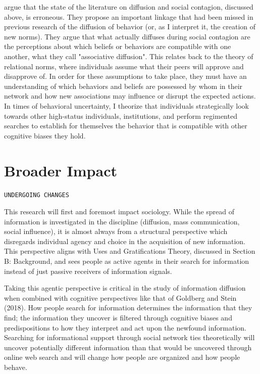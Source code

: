 \citet{goldbergSocialContagionAssociative2018} argue that the state of the
literature on diffusion and social contagion, discussed above, is erroneous.
They propose an important linkage that had been missed in previous research of
the diffusion of behavior (or, as I interpret it, the creation of new norms).
They argue that what actually diffuses during social contagion are the
perceptions about which beliefs or behaviors are compatible with one another,
what they call "associative diffusion". 
This relates back to the theory of relational norms, where individuals assume
what their peers will approve and disapprove of. In order for these assumptions 
to take place, they must have an understanding of which behaviors and beliefs
are possessed by whom in their network and how new associations may influence
or disrupt the expected actions. 
In times of behavioral uncertainty, I
theorize that individuals strategically look towards other high-status
individuals, institutions, and perform regimented searches to establish for
themselves the behavior that is compatible with other cognitive biases they
hold.

\section{Broader Impact}
\begin{center}
    \texttt{UNDERGOING CHANGES}
\end{center}


This research will first and foremost impact sociology. While the spread
of information is investigated in the discipline (diffusion, mass
communication, social influence), it is almost always from a structural
perspective which disregards individual agency and choice in the
acquisition of new information. This perspective aligns with Uses and
Gratifications Theory, discussed in Section B: Background, and sees
people as active agents in their search for information instead of just
passive receivers of information signals.

Taking this agentic perspective is critical in the study of information
diffusion when combined with cognitive perspectives like that of
Goldberg and Stein (2018). How people search for information determines
the information that they find; the information they uncover is filtered
through cognitive biases and predispositions to how they interpret and
act upon the newfound information. Searching for informational support
through social network ties theoretically will uncover potentially
different information than that would be uncovered through online web
search and will change how people are organized and how people behave.

